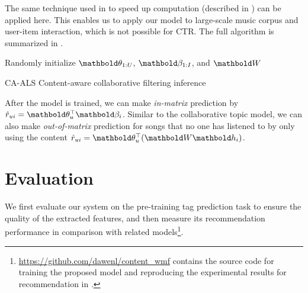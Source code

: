 The same technique used in \cite{hu2008collaborative} to speed up computation (described in ) can be applied here. This enables us to apply our model to large-scale music corpus and user-item interaction, which is not possible for \gls{CTR}. The full algorithm is summarized in .

\begin{algorithm}
\DontPrintSemicolon %
Randomly initialize $\mb\theta_{1:U}$, $\mb\beta_{1:I}$, and $\mbW$\;
\;
\caption{{\sc CA-ALS} Content-aware collaborative filtering inference}
\label{chpt:content:algo:cm}
\end{algorithm}


After the model is trained, we can make \emph{in-matrix} prediction by $\hat{r}_{ui} = \mb\theta_u^\top \mb\beta_i$. Similar to the collaborative topic model, we can also make \emph{out-of-matrix} prediction for songs that no one has listened to by only using the  content $\hat{r}_{ui} = \mb\theta_u^\top (\mbW\mb{h}_i)$.



\section{Evaluation}\label{eval}

We first evaluate our system on the pre-training tag prediction task to ensure the quality of the extracted features, and then measure its recommendation performance in comparison with related models\footnote{\url{https://github.com/dawenl/content_wmf} contains the source code for training the proposed model and reproducing the experimental results for recommendation in .}.


